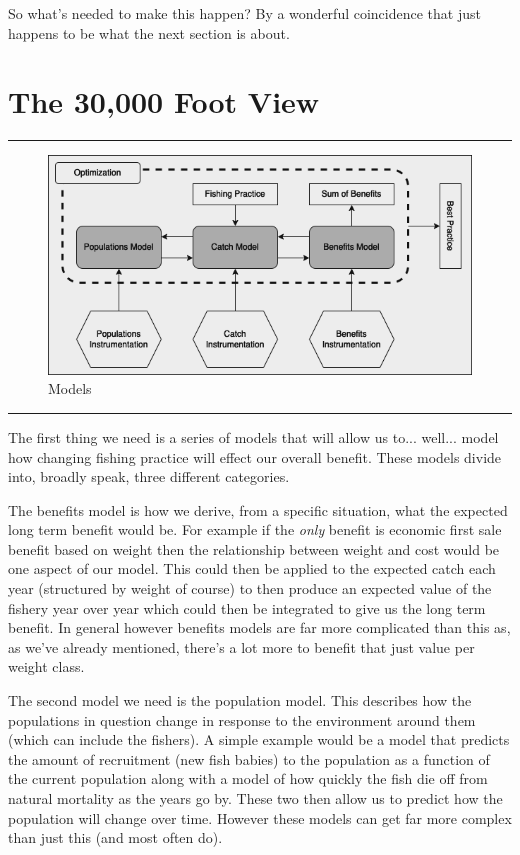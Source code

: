 \documentclass[11pt,a5paper]{book}
\begin{document}
So what's needed to make this happen? By a wonderful coincidence that just happens to be what the next section is about. 
\newpage

\section{The 30,000 Foot View}

\noindent \rule{\textwidth}{0.5pt} 
\begin{figure}[h!] 
  \includegraphics[width=\linewidth]{drawings/high_level_models.png}
  \caption{Models}
  \label{fig:high_level_models}
\end{figure}
\newline
\rule{\textwidth}{0.5pt} 
\vspace{5pt}

The first thing we need is a series of models that will allow us to... well... model how changing fishing practice will effect our overall benefit. These models divide into, broadly speak, three different categories. 
\newline

The benefits model is how we derive, from a specific situation, what the expected long term benefit would be. For example if the \textit{only} benefit is economic first sale benefit based on weight then the relationship between weight and cost would be one aspect of our model. This could then be applied to the expected catch each year (structured by weight of course) to then produce an expected value of the fishery year over year which could then be integrated to give us the long term benefit. In general however benefits models are far more complicated than this as, as we've already mentioned, there's a lot more to benefit that just value per weight class.
\newline

The second model we need is the population model. This describes how the populations in question change in response to the environment around them (which can include the fishers). A simple example would be a model that predicts the amount of recruitment (new fish babies) to the population as a function of the current population along with a model of how quickly the fish die off from natural mortality as the years go by. These two then allow us to predict how the population will change over time. However these models can get far more complex than just this (and most often do). 
\newline
\end{document}

